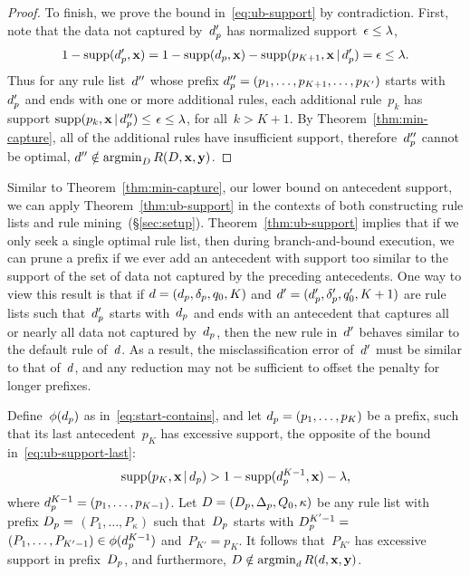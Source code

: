 \begin{proof}
To finish, we prove the bound in~\eqref{eq:ub-support} by contradiction.
%
First, note that the data not captured by~$d_p'$
has normalized support~${\epsilon \le {\lambda}}$, \ie
\begin{align}
1 - \textnormal{supp}(d_p', \mathbf{x}) = 1 - \textnormal{supp}(d_p, \mathbf{x}) - \textnormal{supp}(p_{K+1}, \mathbf{x} \,|\, d_p') = \epsilon \le {\lambda}.
\end{align}
Thus for any rule list~${d}''$ whose prefix
$d_p'' = (p_1, \dots, p_{K+1}, \dots, p_{K'})$ starts
with~$d_p'$ and ends with one or more additional rules,
each additional rule~$p_k$ has support
${\textnormal{supp}(p_k, \mathbf{x} \,|\, d_p'') \le}$ ${\epsilon \le {\lambda}}$,
for all~${k > K+1}$.
%
By Theorem~\ref{thm:min-capture},
all of the additional rules have insufficient support,
therefore~$d_p''$ cannot be optimal,
\ie ${{d}'' \notin \operatorname*{argmin}_{{D}} R({D}, \mathbf{x}, \mathbf{y})}$.
\end{proof}

Similar to Theorem~\ref{thm:min-capture}, our lower bound on
antecedent support, we can apply Theorem~\ref{thm:ub-support}
in the contexts of both constructing rule lists and
rule mining~(\S\ref{sec:setup}).
%
Theorem~\ref{thm:ub-support} implies that if we only seek a single
optimal rule list, then during branch-and-bound execution,
we can prune a prefix if we ever add an antecedent with support
too similar to the support of the set of data not captured by the
preceding antecedents.
%
One way to view this result is that if
${{d} = (d_p, \delta_p, q_0, K)}$
and ${{d}' = (d_p', \delta_p', q_0', K + 1)}$
are rule lists such that~$d_p'$ starts with~$d_p$
and ends with an antecedent that captures all or nearly all
data not captured by~$d_p$, then the new rule in~${d}'$
behaves similar to the default rule of~${d}$.
%
As a result, the misclassification error of~${d}'$ must be
similar to that of~${d}$, and any reduction may not be
sufficient to offset the penalty for longer prefixes.

\begin{proposition}
\label{prop:ub-support}
Define~$\phi(d_p)$ as in~\eqref{eq:start-contains},
and let ${d_p = (p_1, \dots, p_{K})}$ be a prefix,
such that its last antecedent~$p_{K}$ has excessive support,
\ie the opposite of the bound in~\eqref{eq:ub-support-last}:
\begin{align}
\textnormal{supp}(p_K, \mathbf{x} \,|\, d_p) > 1 - \textnormal{supp}(d_p^{K-1}, \mathbf{x}) - {\lambda},
\end{align}
where ${d_p^{K-1} = (p_1, \dots, p_{K-1})}$.
%
Let ${{D} = (D_p, \Delta_p, Q_0, \kappa)}$
be any rule list with prefix
${D_p =}$ ${(P_1, \dots, P_{\kappa})}$
such that~$D_p$ starts with ${D_p^{K'-1} =}$
${(P_1, \dots, P_{K'-1}) \in \phi(d_p^{K-1})}$
and~${P_{K'} = p_{K}}$.
%
It follows that~$P_{K'}$ has excessive support in prefix~$D_p$,
and furthermore, ${{D} \notin \operatorname*{argmin}_{{d}} R({d}, \mathbf{x}, \mathbf{y})}$.
\end{proposition}

